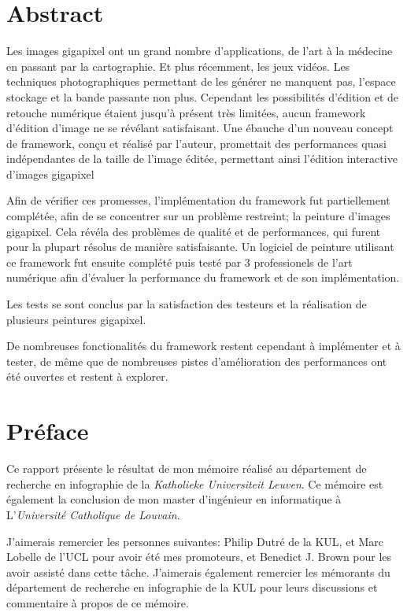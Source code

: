 
\chapter*{Abstract}
	Les images gigapixel ont un grand nombre d'applications, de l'art à la médecine en passant par la cartographie. Et plus 
	récemment, les jeux vidéos. Les techniques photographiques permettant de les générer ne manquent pas, l'espace stockage 
	et la bande passante non plus. Cependant les possibilités d'édition et de retouche numérique étaient jusqu'à présent 
	très limitées, aucun framework d'édition d'image ne se révélant satisfaisant. Une ébauche d'un nouveau concept de framework,
	conçu et réalisé par l'auteur, promettait des performances quasi indépendantes de la taille de l'image éditée, permettant ainsi 
	l'édition interactive d'images gigapixel

	Afin de vérifier ces promesses, l'implémentation du framework fut partiellement complétée, afin de se concentrer sur un problème restreint;
	la peinture d'images gigapixel. Cela révéla des problèmes de qualité et de performances,
	qui furent pour la plupart résolus de manière satisfaisante. Un logiciel de peinture utilisant ce framework fut ensuite 
	complété puis testé par 3 professionels de l'art numérique afin d'évaluer la performance du framework et de son implémentation. 

	Les tests se sont conclus par la satisfaction des testeurs et la réalisation de plusieurs peintures gigapixel. 

	De nombreuses fonctionalités du framework restent cependant à implémenter et à tester, de même que de nombreuses pistes
	d'amélioration des performances ont été ouvertes et restent à explorer.
	

\chapter*{Préface}
	Ce rapport présente le résultat de mon mémoire réalisé au département de recherche en infographie de la \emph{Katholieke Universiteit Leuven}.
	Ce mémoire est également la conclusion de mon master d'ingénieur en informatique à L'\emph{Université Catholique de Louvain}.

	J'aimerais remercier les personnes suivantes: Philip Dutré de la KUL, et Marc Lobelle de l'UCL pour avoir été mes promoteurs,
	et Benedict J. Brown pour les avoir assisté dans cette tâche. J'aimerais également remercier les mémorants du département de recherche en infographie
	de la KUL pour leurs discussions et commentaire à propos de ce mémoire. 

